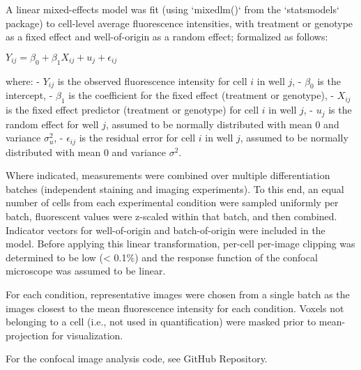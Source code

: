 A linear mixed-effects model was fit (using `mixedlm()` from the `statsmodels` package) to cell-level average fluorescence intensities, with treatment or genotype as a fixed effect and well-of-origin as a random effect; formalized as follows:

$ Y_{ij} = \beta_0 + \beta_1 X_{ij} + u_j + \epsilon_{ij} $

where:
- $Y_{ij}$ is the observed fluorescence intensity for cell $i$ in well $j$,
- $\beta_0$ is the intercept,
- $\beta_1$ is the coefficient for the fixed effect (treatment or genotype),
- $X_{ij}$ is the fixed effect predictor (treatment or genotype) for cell $i$ in well $j$,
- $u_j$ is the random effect for well $j$, assumed to be normally distributed with mean 0 and variance $\sigma_u^2$,
- $\epsilon_{ij}$ is the residual error for cell $i$ in well $j$, assumed to be normally distributed with mean 0 and variance $\sigma^2$.

Where indicated, measurements were combined over multiple differentiation batches (independent staining and imaging experiments). To this end, an equal number of cells from each experimental condition were sampled uniformly per batch, fluorescent values were z-scaled within that batch, and then combined. Indicator vectors for well-of-origin and batch-of-origin were included in the model. Before applying this linear transformation, per-cell per-image clipping was determined to be low (< 0.1\%) and the response function of the confocal microscope was assumed to be linear.

For each condition, representative images were chosen from a single batch as the images closest to the mean fluorescence intensity for each condition. Voxels not belonging to a cell (i.e., not used in quantification) were masked prior to mean-projection for visualization.

For the confocal image analysis code, see GitHub Repository.
